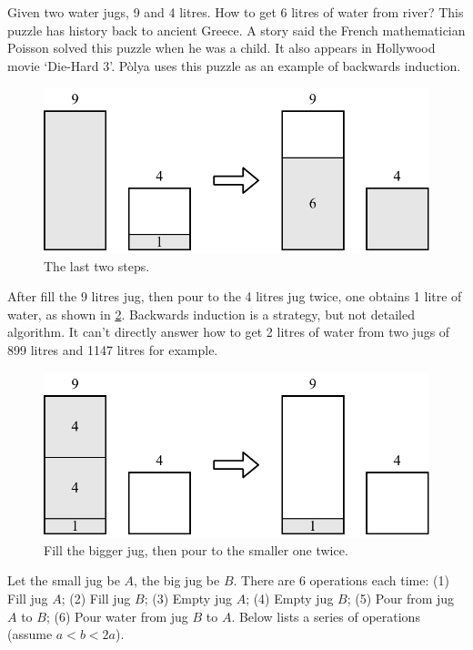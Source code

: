 \documentclass[b5paper]{article}
\begin{document}
Given two water jugs, 9 and 4 litres. How to get 6 litres of water from river? This puzzle has history back to ancient Greece. A story said the French mathematician Poisson solved this puzzle when he was a child. It also appears in Hollywood movie `Die-Hard 3'. P\`{o}lya uses this puzzle as an example of backwards induction\cite{how-to-solve-it}.

\begin{figure}[htbp]
 \centering
 \includegraphics[scale=0.5]{img/jugs-last}
 \caption{The last two steps.}
 \label{fig:jugs-r1}
\end{figure}

After fill the 9 litres jug, then pour to the 4 litres jug twice, one obtains 1 litre of water, as shown in \cref{fig:jugs-r2}. Backwards induction is a strategy, but not detailed algorithm. It can't directly answer how to get 2 litres of water from two jugs of 899 litres and 1147 litres for example.

\begin{figure}[htbp]
 \centering
 \includegraphics[scale=0.5]{img/jugs-last-two}
 \caption{Fill the bigger jug, then pour to the smaller one twice.}
 \label{fig:jugs-r2}
\end{figure}

Let the small jug be $A$, the big jug be $B$. There are 6 operations each time: (1) Fill jug $A$; (2) Fill jug $B$; (3) Empty jug $A$; (4) Empty jug $B$; (5) Pour from jug $A$ to $B$; (6) Pour water from jug $B$ to $A$. Below lists a series of operations (assume $a < b < 2a$).
\end{document}
